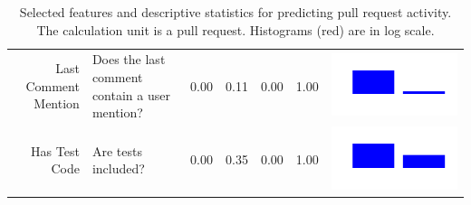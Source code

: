 \documentclass[conference]{IEEEtran}
\begin{document}
\begin{table}[ht]
\begin{tabular}{rp{26em}rrrrc}
    Last Comment Mention & Does the last comment contain a user mention? & 0.00 & 0.11 & 0.00 & 1.00 & \includegraphics[scale = 0.1, clip = true, trim= 50px 60px 50px 60px]{../figs/hist-features/hist-lastCommentMention.pdf} \\
    Has Test Code & Are tests included? & 0.00 & 0.35 & 0.00 & 1.00 & \includegraphics[scale = 0.1, clip = true, trim= 50px 60px 50px 60px]{../figs/hist-features/hist-hasTestCode.pdf} \\
    \hline
  \end{tabular}
  \caption{Selected features and descriptive statistics for predicting pull
  request activity. The calculation unit is a pull request.
  Histograms (red) are in log scale.}
  \label{tab:features}
\end{table}
\end{document}
